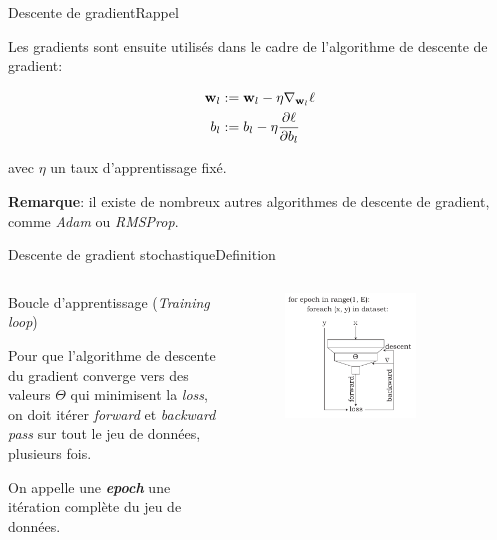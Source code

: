 \documentclass[12pt,dvipsnames,aspectratio=169]{beamer}
\newcommand{\w}[0]{\mathbf{w}}
\begin{document}
\begin{frame}{Descente de gradient}{Rappel}

Les gradients sont ensuite utilisés dans le cadre de l'algorithme de descente de gradient:

\begin{align*}
    \w_l &:= \w_l - \eta \nabla_{\w_l}\ell \\
    b_l &:= b_l - \eta \pdv{\ell}{b_l}
\end{align*}

avec $\eta$ un taux d'apprentissage fixé.

\textbf{Remarque}: il existe de nombreux autres algorithmes de descente de gradient, comme \textit{Adam} ou \textit{RMSProp}.

\end{frame}

\begin{frame}{Descente de gradient stochastique}{Definition}


\begin{columns}
\begin{block}{Boucle d'apprentissage (\textit{Training loop})}

Pour que l'algorithme de descente du gradient converge vers des valeurs $\Theta$ qui minimisent la \textit{loss}, on doit itérer \textit{forward} et \textit{backward pass} sur tout le jeu de données, plusieurs fois.

\vspace{1em}

On appelle une \textbf{\textit{epoch}} une itération complète du jeu de données.

\end{block}
    \begin{figure}
        \centering
        \includegraphics[width=0.7\textwidth]{figures/trainingloop.pdf}
    \end{figure}
\end{columns}

\end{frame}
\end{document}
